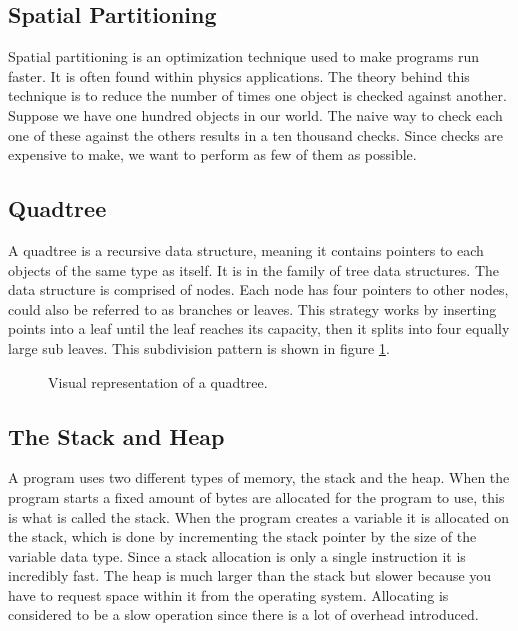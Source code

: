 \documentclass[a4paper, 12pt]{article}
\begin{document}
\subsection{Spatial Partitioning}
Spatial partitioning is an optimization technique used to make programs run
faster. It is often found within physics applications. The theory behind this
technique is to reduce the number of times one object is checked against
another. Suppose we have one hundred objects in our world. The naive way to
check each one of these against the others results in a ten thousand checks.
Since checks are expensive to make, we want to perform as few of them as
possible.

\subsection{Quadtree}
A quadtree is a recursive data structure, meaning it contains pointers to each
objects of the same type as itself. It is in the family of tree data structures.
The data structure is comprised of nodes. Each node has four pointers to other
nodes, could also be referred to as branches or leaves. This strategy works by
inserting points into a leaf until the leaf reaches its capacity, then it splits
into four equally large sub leaves. This subdivision pattern is shown in figure
\ref{fig:quadtree}.

\begin{figure}[ht]
    
    \caption{Visual representation of a quadtree.}
    \label{fig:quadtree}
\end{figure}

\subsection{The Stack and Heap}
A program uses two different types of memory, the stack and the heap. When the
program starts a fixed amount of bytes are allocated for the program to use,
this is what is called the stack. When the program creates a variable it is
allocated on the stack, which is done by incrementing the stack pointer by the
size of the variable data type. Since a stack allocation is only a single
instruction it is incredibly fast. The heap is much larger than the stack but
slower because you have to request space within it from the operating system.
Allocating is considered to be a slow operation since there is a lot of overhead
introduced.
\end{document}
